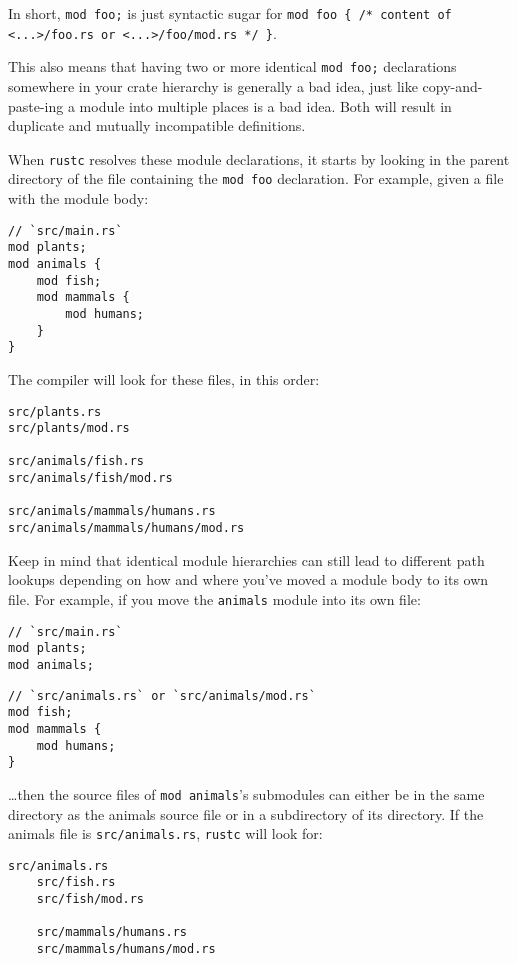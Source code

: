 \documentclass[]{article}
\begin{document}
In short, \texttt{mod foo;} is just syntactic sugar for
\texttt{mod foo \{ /* content of \textless{}...\textgreater{}/foo.rs or \textless{}...\textgreater{}/foo/mod.rs */ \}}.

This also means that having two or more identical \texttt{mod foo;}
declarations somewhere in your crate hierarchy is generally a bad idea,
just like copy-and-paste-ing a module into multiple places is a bad
idea. Both will result in duplicate and mutually incompatible
definitions.

When \texttt{rustc} resolves these module declarations, it starts by
looking in the parent directory of the file containing the
\texttt{mod foo} declaration. For example, given a file with the module
body:

\begin{verbatim}
// `src/main.rs`
mod plants;
mod animals {
    mod fish;
    mod mammals {
        mod humans;
    }
}
\end{verbatim}

The compiler will look for these files, in this order:

\begin{verbatim}
src/plants.rs
src/plants/mod.rs

src/animals/fish.rs
src/animals/fish/mod.rs

src/animals/mammals/humans.rs
src/animals/mammals/humans/mod.rs
\end{verbatim}

Keep in mind that identical module hierarchies can still lead to
different path lookups depending on how and where you've moved a module
body to its own file. For example, if you move the \texttt{animals}
module into its own file:

\begin{verbatim}
// `src/main.rs`
mod plants;
mod animals;
\end{verbatim}

\begin{verbatim}
// `src/animals.rs` or `src/animals/mod.rs`
mod fish;
mod mammals {
    mod humans;
}
\end{verbatim}

\ldots{}then the source files of \texttt{mod animals}'s submodules can
either be in the same directory as the animals source file or in a
subdirectory of its directory. If the animals file is
\texttt{src/animals.rs}, \texttt{rustc} will look for:

\begin{verbatim}
src/animals.rs
    src/fish.rs
    src/fish/mod.rs

    src/mammals/humans.rs
    src/mammals/humans/mod.rs
\end{verbatim}
\end{document}
